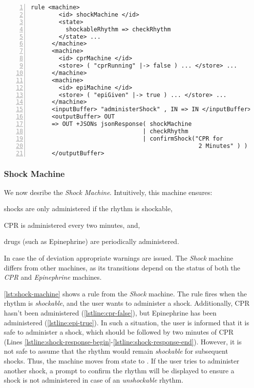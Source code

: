 \begin{lstlisting}[float=b!,
  frame=single,
  style=ksty,
  language=k,
  numbers=left,
  numbersep=5pt,
  caption={Shock Machine in $\K$},
  label={lst:shock-machine},
  xleftmargin=3ex
]
rule <machine>
        <id> shockMachine </id>
        <state>
          shockableRhythm => checkRhythm                         @\label{lstline:shock-state}@
        </state> ...
      </machine>
      <machine>
        <id> cprMachine </id>
        <store> ( "cprRunning" |-> false ) ... </store> ...      @\label{lstline:cpr-false}@
      </machine>
      <machine>
        <id> epiMachine </id>
        <store> ( "epiGiven" |-> true ) ... </store> ...        @\label{lstline:epi-true}@
      </machine>
      <inputBuffer> "administerShock" , IN => IN </inputBuffer>
      <outputBuffer> OUT                                        @\label{lstline:shock-response-begin}@
      => OUT +JSONs jsonResponse( shockMachine
                                | checkRhythm
                                | confirmShock("CPR for
                                                2 Minutes" ) )  @\label{lstline:shock-response-end}@
      </outputBuffer>
\end{lstlisting}

\subsubsection{Shock Machine}

We now desribe the \textit{Shock Machine}. Intuitively, this
machine ensures:
\begin{enumerate*}[label=(\alph*)]
  \item shocks are only administered if the rhythm is shockable,
  \item CPR is administered every two minutes, and,
  \item drugs (such as Epinephrine) are periodically administered.
\end{enumerate*}
In case the of deviation appropriate warnings are issued. The \textit{Shock}
machine differs from other machines, as its transitions depend
on the status of both the \textit{CPR} and \textit{Epinephrine} machines.

\autoref{lst:shock-machine} shows a rule from the \textit{Shock} machine.
The rule fires when the rhythm is \textit{shockable}, and the user
wants to administer a shock. Additionally, CPR hasn't been administered
(\autoref{lstline:cpr-false}), but
Epinephrine has been administered (\autoref{lstline:epi-true}).
In such a situation, the user is informed that it is safe to
administer a shock, which should be followed by
two minutes of CPR (Lines
\ref{lstline:shock-response-begin}-\ref{lstline:shock-response-end}).
However, it is not safe to assume that the rhythm would remain
\textit{shockable} for subsequent shocks. Thus, the machine moves from
state  to . If the
user tries to administer another shock, a prompt to confirm the rhythm will be
displayed to ensure a shock is not administered in case of an \emph{unshockable}
rhythm.

